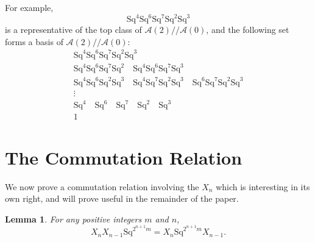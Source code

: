 \documentclass{article}
\newcommand{\A}{\mathcal{A}}
\newcommand{\Sq}{\mathrm{Sq}}
\newcommand{\mmod}{/\!/\!}
\newtheorem{lem}{Lemma}
\begin{document}
For example,
\[ \Sq^4\Sq^6\Sq^7\Sq^2\Sq^3 \]
is a representative of the top class of $\A(2)\mmod \A(0)$, and the following set forms a basis of $\A(2)\mmod \A(0)$:
\begin{gather*}
  \Sq^4\Sq^6\Sq^7\Sq^2\Sq^3 \\
  \Sq^4\Sq^6\Sq^7\Sq^2 \quad \Sq^4\Sq^6\Sq^7\Sq^3 \\
  \Sq^4\Sq^6\Sq^2\Sq^3 \quad \Sq^4\Sq^7\Sq^2\Sq^3 \quad \Sq^6\Sq^7\Sq^2\Sq^3 \\
  \vdots \\
  \Sq^4 \quad \Sq^6 \quad \Sq^7 \quad \Sq^2 \quad \Sq^3 \\
  1
\end{gather*}

\section{The Commutation Relation}

We now prove a commutation relation involving the $X_n$ which is interesting in its own right, and will prove useful in the remainder of the paper.

\begin{lem}\label{lem:commutation-relation}
  For any positive integers $m$ and $n$,
  \[X_nX_{n-1}\Sq^{2^{n+1}m} = X_n\Sq^{2^{n+1}m}X_{n-1}.\]
\end{lem}
\end{document}
